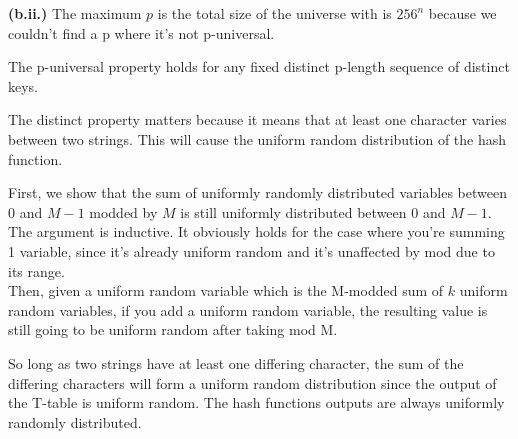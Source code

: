 \documentclass[11pt]{article}
\renewcommand{\part}[1] {\vspace{.10in} {\bf (#1)}}
\begin{document}
\part{b.ii.}
The maximum $p$ is the total size of the universe with is $256^n$ because we couldn't find a p where it's not p-universal.

The p-universal property holds for any fixed distinct p-length sequence of distinct keys.

The distinct property matters because it means that at least one character varies between two strings. This will cause the uniform random distribution of the hash function.

First, we show that the sum of uniformly randomly distributed variables between 0 and $M-1$ modded by $M$ is still uniformly distributed between 0 and $M-1$.\\
The argument is inductive. It obviously holds for the case where you're summing 1 variable, since it's already uniform random and it's unaffected by mod due to its range.\\
Then, given a uniform random variable which is the M-modded sum of $k$ uniform random variables, if you add a uniform random variable, the resulting value is still going to be uniform random after taking mod M.

So long as two strings have at least one differing character, the sum of the differing characters will form a uniform random distribution since the output of the T-table is uniform random.
The hash functions outputs are always uniformly randomly distributed.
\end{document}

